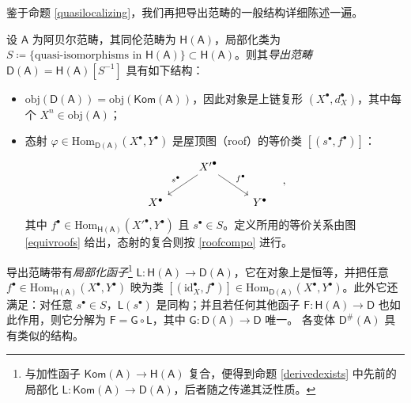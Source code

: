 鉴于命题 \ref{quasilocalizing}，我们再把导出范畴的一般结构详细陈述一遍。

\begin{Def}\label{dercatdef}
	设 $\mathsf{A}$ 为阿贝尔范畴，其同伦范畴为 $\mathsf{H(A)}$，局部化类为 $S\coloneqq\{\text{quasi-isomorphisms in }\mathsf{H(A)}\}\subset\mathsf{H(A)}$。则其\textit{导出范畴} $\mathsf{D(A)}=\mathsf{H(A)}[S^{-1}]$ 具有如下结构：
	\begin{itemize}[leftmargin=0.5cm]
		\renewcommand{\labelitemi}{\textendash}
		\item $\text{obj}(\mathsf{D(A)})=\text{obj}(\mathsf{Kom(A)})$，因此对象是上链复形 $(X^\bullet,d_X^\bullet)$，其中每个 $X^n\in\text{obj}(\mathsf{A})$；
		
		\item 态射 $\varphi\in\text{Hom}_\mathsf{D(A)}(X^\bullet,Y^\bullet)$ 是屋顶图（roof）的等价类 $[(s^\bullet,f^\bullet)]$：
		\begin{equation}
			\begin{tikzcd}
				& {X'}^\bullet\arrow[dl, "s^\bullet"']\arrow[dr, "f^\bullet"] & \\
				X^\bullet & & Y^\bullet
			\end{tikzcd}\quad,
		\end{equation}
		其中 $f^\bullet\in\text{Hom}_{\mathsf{H(A)}}(X'^\bullet,Y^\bullet)$ 且 $s^\bullet\in S$。定义所用的等价关系由图 \eqref{equivroofs} 给出，态射的复合则按 \eqref{roofcompo} 进行。
	\end{itemize}
	导出范畴带有\textit{局部化函子}\footnote{与加性函子 $\mathsf{Kom(A)}\rightarrow\mathsf{H(A)}$ 复合，便得到命题 \ref{derivedexists} 中先前的局部化 $\mathsf{L}:\mathsf{Kom(A)}\rightarrow\mathsf{D(A)}$，后者随之传递其泛性质。} $\mathsf{L}:\mathsf{H(A)}\rightarrow\mathsf{D(A)}$，它在对象上是恒等，并把任意 $f^\bullet\in\text{Hom}_\mathsf{H(A)}(X^\bullet,Y^\bullet)$ 映为类 $[(\text{id}_X^\bullet,f^\bullet)]\in\text{Hom}_\mathsf{D(A)}(X^\bullet,Y^\bullet)$。此外它还满足：对任意 $s^\bullet\in S$，$\mathsf{L}(s^\bullet)$ 是同构；并且若任何其他函子 $\mathsf{F}:\mathsf{H(A)}\rightarrow\mathsf{D}$ 也如此作用，则它分解为 $\mathsf{F}=\mathsf{G}\circ\mathsf{L}$，其中 $\mathsf{G}:\mathsf{D(A)}\rightarrow\mathsf{D}$ 唯一。
	各变体 $\mathsf{D^\#\!(A)}$ 具有类似的结构。
\end{Def}


